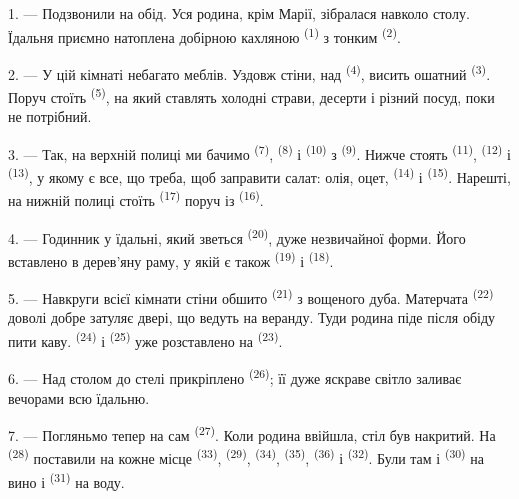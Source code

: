 \VUsaut{3.6mm}
\VUsaut{3.0mm}

1. --- Подзвонили на обід. Уся родина, крім Марії, зібралася навколо столу.
Їдальня приємно натоплена добірною кахляною  \textsuperscript{(1)}
з тонким  \textsuperscript{(2)}.

2. --- У цій кімнаті небагато меблів. Уздовж стіни, над 
\textsuperscript{(4)}, висить ошатний 
\textsuperscript{(3)}. Поруч стоїть  \textsuperscript{(5)}, на який
ставлять холодні страви, десерти і різний посуд, поки не потрібний.

3. --- Так, на верхній полиці ми бачимо 
\textsuperscript{(7)},  \textsuperscript{(8)} і 
\textsuperscript{(10)} з  \textsuperscript{(9)}. Нижче стоять
 \textsuperscript{(11)},  \textsuperscript{(12)} і
 \textsuperscript{(13)}, у якому є все, що треба, щоб заправити
салат: олія, оцет,  \textsuperscript{(14)} і 
\textsuperscript{(15)}. Нарешті, на нижній полиці стоїть 
\textsuperscript{(17)} поруч із  \textsuperscript{(16)}.

4. --- Годинник у їдальні, який зветься 
\textsuperscript{(20)}, дуже незвичайної форми. Його вставлено в дерев'яну раму,
у якій є також  \textsuperscript{(19)} і 
\textsuperscript{(18)}.

\VUsaut{4.6mm}
\VUsaut{3.0mm}

5. --- Навкруги всієї кімнати стіни обшито 
\textsuperscript{(21)} з вощеного дуба. Матерчата 
\textsuperscript{(22)} доволі добре затуляє двері, що ведуть на веранду. Туди
родина піде після обіду пити каву.  \textsuperscript{(24)} і
 \textsuperscript{(25)} уже розставлено на 
\textsuperscript{(23)}.

6. --- Над столом до стелі прикріплено 
\textsuperscript{(26)}; її дуже яскраве світло заливає вечорами всю їдальню.

7. --- Погляньмо тепер на сам  \textsuperscript{(27)}. Коли
родина ввійшла, стіл був накритий. На  \textsuperscript{(28)}
поставили на кожне місце  \textsuperscript{(33)},
 \textsuperscript{(29)},  \textsuperscript{(34)},
 \textsuperscript{(35)},  \textsuperscript{(36)} і
 \textsuperscript{(32)}. Були там і 
\textsuperscript{(30)} на вино і  \textsuperscript{(31)} на воду.

